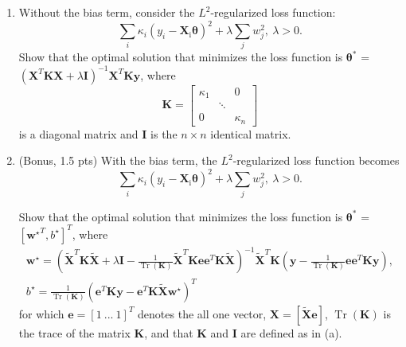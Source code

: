 \documentclass{article}
\DeclareMathOperator{\Tr}{Tr}
\def\matI{{\mathbf I}}
\def\matK{{\mathbf K}}
\begin{document}
\begin{enumerate}[label=(\alph*)]
\item Without the bias term, consider the $L^2$-regularized loss function:
$$\sum_i \kappa_i \left(y_i-\boldsymbol{X}_{\mathrm{i}} \boldsymbol{\theta}\right)^2+\lambda \sum_j w_j^2, \ \lambda > 0.$$
Show that the optimal solution that minimizes the loss function is $\boldsymbol{\theta^*}$ = $\left( \boldsymbol{X}^T \boldsymbol{K} \boldsymbol{X} + \lambda \boldsymbol{I}\right)^{-1} \boldsymbol{X}^T \boldsymbol{K} \boldsymbol{y}$, where
\begin{equation*}
  \boldsymbol{K} =
  \begin{bmatrix}
    \kappa_{1} & & 0\\
    & \ddots & \\
    0 & & \kappa_{n}
  \end{bmatrix}
\end{equation*}
%
is a diagonal matrix and $\boldsymbol{I}$ is the $n \times n$ identical matrix. 
%
\item (Bonus, 1.5 pts) With the bias term, the $L^2$-regularized loss function becomes
$$\sum_i \kappa_i \left(y_i-\boldsymbol{X}_{\mathrm{i}} \boldsymbol{\theta} \right)^2+\lambda \sum_j w_j^2, \ \lambda > 0.$$

Show that the optimal solution that minimizes the loss function is $\boldsymbol{\theta^*} $ =  $[ \boldsymbol{w^{\star}}^T, b^{\star}]^T$, where 
\begin{gather*}
\boldsymbol{w^{\star}}=\left( \boldsymbol{\tilde{X}}^T \boldsymbol{K} \boldsymbol{\tilde{X}} + \lambda \boldsymbol{I} - \frac{1}{\Tr{(\boldsymbol{K})}} \boldsymbol{\tilde{X}}^T \boldsymbol{K} \boldsymbol{e} \boldsymbol{e}^T \boldsymbol{K} \boldsymbol{\tilde{X}} \right)^{-1} \boldsymbol{\tilde{X}}^T \boldsymbol{K} \left( \boldsymbol{y} - \frac{1}{\Tr{(\boldsymbol{K})}} \boldsymbol{e} \boldsymbol{e}^T \boldsymbol{K} \boldsymbol{y} \right),\\
b^{\star} = \frac{1}{\Tr{(\boldsymbol{K})}} \left( \boldsymbol{e}^T \boldsymbol{K} \boldsymbol{y} - \boldsymbol{e}^T \boldsymbol{K} \boldsymbol{\tilde{X}} \boldsymbol{w^{\star}} \right)^T
\end{gather*}
%
for which $\boldsymbol{e}= [1 \ ... \ 1]^T$ denotes the all one vector, $\boldsymbol{X} = [\boldsymbol{\tilde{X}} \boldsymbol{e}] $, $\Tr{(\boldsymbol{K})}$ is the trace of the matrix $\boldsymbol{K}$, and that $\matK$ and $\matI$ are defined as in (a).
\end{enumerate}
\end{document}
